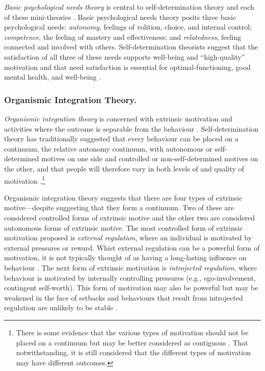 \documentclass[
  12pt,
  a4paper,
]{book}
\begin{document}
\emph{Basic psychological needs theory} is central to self-determination theory and each of these mini-theories \citep{Ryan2002}. Basic psychological needs theory posits three basic psychological needs: \emph{autonomy}, feelings of volition, choice, and internal control; \emph{competence}, the feeling of mastery and effectiveness; and \emph{relatedness}, feeling connected and involved with others. Self-determination theorists suggest that the satisfaction of all three of these needs supports well-being and ``high-quality'' motivation \citep{Ryan2019} and that need satisfaction is essential for optimal-functioning, good mental health, and well-being \citep{Chen2015, Deci2000}.

\hypertarget{organismic-integration-theory.}{%
\subsubsection{Organismic Integration Theory.}\label{organismic-integration-theory.}}

\emph{Organismic integration theory} is concerned with extrinsic motivation and activities where the outcome is separable from the behaviour \citep{Ryan1985}. Self-determination theory has traditionally suggested that every behaviour can be placed on a continuum, the relative autonomy continuum, with autonomous or self-determined motives on one side and controlled or non-self-determined motives on the other, and that people will therefore vary in both levels of and quality of motivation \citep{Deci1985b, Sheldon2019}.\footnote{There is some evidence that the various types of motivation should not be placed on a continuum but may be better considered as contiguous \citep{Chemolli2014}. That notwithstanding, it is still considered that the different types of motivation may have different outcomes.}

Organismic integration theory suggests that there are four types of extrinsic motive---despite suggesting that they form a continuum. Two of these are considered controlled forms of extrinsic motive and the other two are considered autonomous forms of extrinsic motive. The most controlled form of extrinsic motivation proposed is \emph{external regulation}, where an individual is motivated by external pressures or reward. Whist external regulation can be a powerful form of motivation, it is not typically thought of as having a long-lasting influence on behaviour \citep{Ryan2000c}. The next form of extrinsic motivation is \emph{introjected regulation}, where behaviour is motivated by internally controlling pressures (e.g., ego-involvement, contingent self-worth). This form of motivation may also be powerful but may be weakened in the face of setbacks and behaviours that result from introjected regulation are unlikely to be stable \citep{Deci1995, Ryan2019}.
\end{document}
